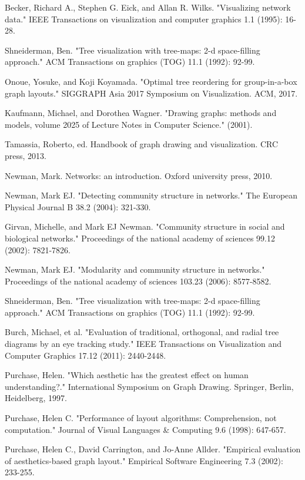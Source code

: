 \documentclass{llncs}
\begin{document}
\begin{thebibliography}{5}
Becker, Richard A., Stephen G. Eick, and Allan R. Wilks. "Visualizing network data." IEEE Transactions on visualization and computer graphics 1.1 (1995): 16-28.

Shneiderman, Ben. "Tree visualization with tree-maps: 2-d space-filling approach." ACM Transactions on graphics (TOG) 11.1 (1992): 92-99.

Onoue, Yosuke, and Koji Koyamada. "Optimal tree reordering for group-in-a-box graph layouts." SIGGRAPH Asia 2017 Symposium on Visualization. ACM, 2017.

Kaufmann, Michael, and Dorothea Wagner. "Drawing graphs: methods and models, volume 2025 of Lecture Notes in Computer Science." (2001).

Tamassia, Roberto, ed. Handbook of graph drawing and visualization. CRC press, 2013.

Newman, Mark. Networks: an introduction. Oxford university press, 2010.

Newman, Mark EJ. "Detecting community structure in networks." The European Physical Journal B 38.2 (2004): 321-330.

Girvan, Michelle, and Mark EJ Newman. "Community structure in social and biological networks." Proceedings of the national academy of sciences 99.12 (2002): 7821-7826.

Newman, Mark EJ. "Modularity and community structure in networks." Proceedings of the national academy of sciences 103.23 (2006): 8577-8582.

Shneiderman, Ben. "Tree visualization with tree-maps: 2-d space-filling approach." ACM Transactions on graphics (TOG) 11.1 (1992): 92-99.

Burch, Michael, et al. "Evaluation of traditional, orthogonal, and radial tree diagrams by an eye tracking study." IEEE Transactions on Visualization and Computer Graphics 17.12 (2011): 2440-2448.

Purchase, Helen. "Which aesthetic has the greatest effect on human understanding?." International Symposium on Graph Drawing. Springer, Berlin, Heidelberg, 1997.

Purchase, Helen C. "Performance of layout algorithms: Comprehension, not computation." Journal of Visual Languages \& Computing 9.6 (1998): 647-657.

Purchase, Helen C., David Carrington, and Jo-Anne Allder. "Empirical evaluation of aesthetics-based graph layout." Empirical Software Engineering 7.3 (2002): 233-255.


\end{thebibliography}
\end{document}
